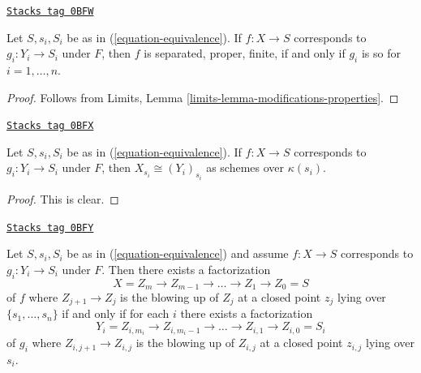 \begin{lemma}
\label{resolve-lemma-equivalence-properties}
\href{https://stacks.math.columbia.edu/tag/0BFW}{\texttt{Stacks tag 0BFW}}

Let $S, s_i, S_i$ be as in (\ref{equation-equivalence}).
If $f : X \to S$ corresponds to $g_i : Y_i \to S_i$ under $F$,
then $f$ is separated, proper, finite, if and only if $g_i$ is so
for $i = 1, \ldots, n$.
\end{lemma}

\begin{proof}
Follows from Limits, Lemma
\ref{limits-lemma-modifications-properties}.
\end{proof}

\begin{lemma}
\label{resolve-lemma-equivalence-fibre}
\href{https://stacks.math.columbia.edu/tag/0BFX}{\texttt{Stacks tag 0BFX}}

Let $S, s_i, S_i$ be as in (\ref{equation-equivalence}).
If $f : X \to S$ corresponds to $g_i : Y_i \to S_i$ under $F$,
then $X_{s_i} \cong (Y_i)_{s_i}$ as schemes over $\kappa(s_i)$.
\end{lemma}

\begin{proof}
This is clear.
\end{proof}

\begin{lemma}
\label{resolve-lemma-equivalence-sequence-blowups}
\href{https://stacks.math.columbia.edu/tag/0BFY}{\texttt{Stacks tag 0BFY}}

Let $S, s_i, S_i$ be as in (\ref{equation-equivalence})
and assume $f : X \to S$ corresponds to $g_i : Y_i \to S_i$ under $F$.
Then there exists a factorization
$$
X = Z_m \to Z_{m - 1} \to \ldots \to Z_1 \to Z_0 = S
$$
of $f$ where $Z_{j + 1} \to Z_j$ is the blowing up of $Z_j$ at a closed
point $z_j$ lying over $\{s_1, \ldots, s_n\}$ if and only if for each
$i$ there exists a factorization
$$
Y_i = Z_{i, m_i} \to Z_{i, m_i - 1} \to \ldots \to Z_{i, 1} \to Z_{i, 0} = S_i
$$
of $g_i$ where $Z_{i, j + 1} \to Z_{i, j}$ is the blowing up of $Z_{i, j}$
at a closed point $z_{i, j}$ lying over $s_i$.
\end{lemma}

